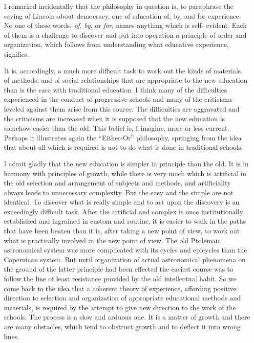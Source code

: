 I remarked incidentally that the philosophy in question is, to paraphrase the saying of 
Lincoln about democracy, one of education of, by, and for experience. No one of these 
words, \textit{of, by}, or \textit{for}, names anything which is self- evident. Each of them is a challenge 
to discover and put into operation a principle of order and organization, which follows 
from understanding what educative experience, signifies. 

It is, accordingly, a much more difficult task to work out the kinds of materials, of 
methods, and of social relationships that are appropriate to the new education than is the 
case with traditional education. I think many of the difficulties experienced in the conduct 
of progressive schools and many of the criticisms leveled against them arise from this 
source. The difficulties are aggravated and the criticisms are increased when it is 
supposed that the new education is somehow easier than the old. This belief is, I imagine, 
more or less current. Perhaps it illustrates again the \enquote{Either-Or} philosophy, springing from 
the idea that about all which is required is not to do what is done in traditional schools. 

I admit gladly that the new education is simpler in principle than the old. It is in 
harmony with principles of growth, while there is very much which is artificial in the old 
selection and arrangement of subjects and methods, and artificiality always leads to unnecessary complexity. But the easy and the simple are not identical. To discover what 
is really simple and to act upon the discovery is an exceedingly difficult task. After the 
artificial and complex is once institutionally established and ingrained in custom and 
routine, it is easier to walk in the paths that have been beaten than it is, after taking a new 
point of view, to work out what is practically involved in the new point of view. The old 
Ptolemaic astronomical system was more complicated with its cycles and epicycles than 
the Copernican system. But until organization of actual astronomical phenomena on the 
ground of the latter principle had been effected the easiest course was to follow the line 
of least resistance provided by the old intellectual habit. So we come back to the idea that 
a coherent theory of experience, affording positive direction to selection and organization 
of appropriate educational methods and materials, is required by the attempt to give new 
direction to the work of the schools. The process is a slow and arduous one. It is a matter 
of growth and there are many obstacles, which tend to obstruct growth and to deflect it 
into wrong lines. 

